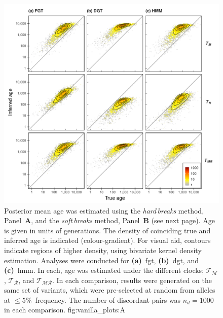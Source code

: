 

\begin{figure}[!tbp]
	{\footnotesize\quad{}} \\
	\includegraphics[width=\textwidth]{./img/ch5/vanilla_hard_breaks}
	{Posterior mean age was estimated using the	\emph{hard\,breaks} method, Panel~\textbf{A}, and the \emph{soft\,breaks} method, Panel~\textbf{B} (see next page).
	Age is given in units of generations.
	The density of coinciding true and inferred age is indicated (colour-gradient).
	For visual aid, contours indicate regions of higher density, using bivariate  kernel density estimation.
	Analyses were conducted for \textbf{(a)}~\gls{fgt}, \textbf{(b)}~\gls{dgt}, and \textbf{(c)}~\gls{hmm}.
	In each, age was estimated under the  different clocks; \ie $\mathcal{T_{\!M}}$, $\mathcal{T_{\!R}}$, and $\mathcal{T_{\!M\!R}}$.
	In each comparison, results were generated on the same set of  variants, which were pre-selected at random from alleles at $\leq5\%$~frequency.
	The number of discordant pairs was ${n_d = \num{1000}}$ in each comparison.}
	{fig:vanilla_plots:A}
\end{figure}

